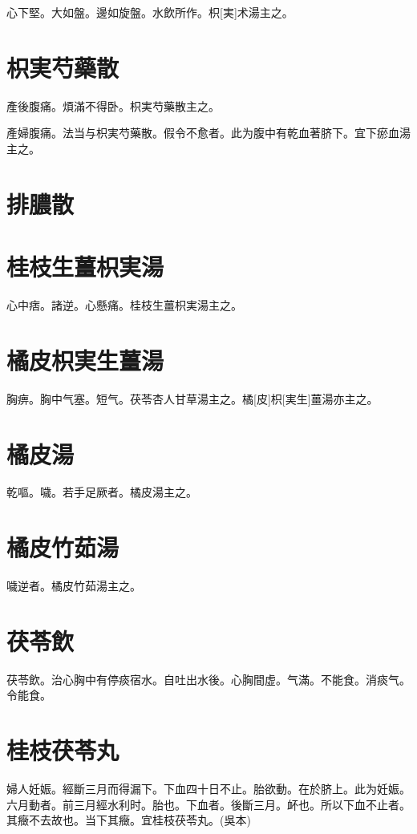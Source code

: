 \documentclass[12pt,oneside,UTF8,b5paper]{ctexbook}她她她她她她她
\begin{document}
心下堅。大如盤。邊如旋盤。水飲所作。枳[実]术湯主之。

\section{枳実芍藥散}

產後腹痛。煩滿不得卧。枳実芍藥散主之。

產婦腹痛。法当与枳実芍藥散。假令不愈者。此为腹中有乾血著脐下。宜下瘀血湯主之。

\section{排膿散}

\section{桂枝生薑枳実湯}

心中痞。諸逆。心懸痛。桂枝生薑枳実湯主之。

\section{橘皮枳実生薑湯}

胸痹。胸中气塞。短气。茯苓杏人甘草湯主之。橘[皮]枳[実生]薑湯亦主之。

\section{橘皮湯}

乾嘔。噦。若手足厥者。橘皮湯主之。

\section{橘皮竹茹湯}

噦逆者。橘皮竹茹湯主之。

\section{茯苓飲}

茯苓飲。治心胸中有停痰宿水。自吐出水後。心胸間虚。气滿。不能食。消痰气。令能食。

\section{桂枝茯苓丸}

婦人妊娠。經斷三月而得漏下。下血四十日不止。胎欲動。在於脐上。此为妊娠。六月動者。前三月經水利时。胎也。下血者。後斷三月。衃也。所以下血不止者。其癥不去故也。当下其癥。宜桂枝茯苓丸。(吳本)
\end{document}
